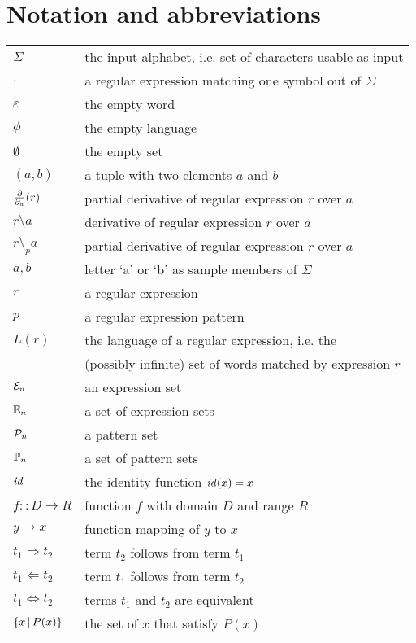 \chapter*{Notation and abbreviations}


\begin{tabular}{ll}
   $\Sigma$ & the input alphabet, i.e. set of characters usable as input \\
   $.$ & a regular expression matching one symbol out of $\Sigma$ \\
   $\varepsilon$ & the empty word \\
   $\phi$ & the empty language \\
   $\emptyset$ & the empty set \\
   $(a,b)$ & a tuple with two elements $a$ and $b$ \\
   $\frac{\partial}{\partial_{a}}(r)$ & partial derivative of regular expression $r$ over $a$ \\
   $r \setminus a$ & derivative of regular expression $r$ over $a$ \\
   $r \setminus_p a$ & partial derivative of regular expression $r$ over $a$ \\
   $a, b$ & letter `a' or `b' as sample members of $\Sigma$ \\
   $r$ & a regular expression \\
   $p$ & a regular expression pattern \\
   $L(r)$ & the language of a regular expression, i.e. the \\
          & (possibly infinite) set of words matched by expression $r$ \\
   $\mathcal{E}_n$ & an expression set \\
   $\mathbb{E}_n$ & a set of expression sets \\
   $\mathcal{P}_n$ & a pattern set \\
   $\mathbb{P}_n$ & a set of pattern sets \\
   $\mathit{id}$ & the identity function $\mathit{id}(x) = x$ \\
   $f :: D \to R$ & function $f$ with domain $D$ and range $R$ \\
   $y \mapsto x$ & function mapping of $y$ to $x$ \\
   $t_1 \Rightarrow t_2$ & term $t_2$ follows from term $t_1$ \\
   $t_1 \Leftarrow t_2$ & term $t_1$ follows from term $t_2$ \\
   $t_1 \Leftrightarrow t_2$ & terms $t_1$ and $t_2$ are equivalent \\
   $\{ x \operatorname{|} P(x) \}$ & the set of $x$ that satisfy $P(x)$ \\
\end{tabular}

